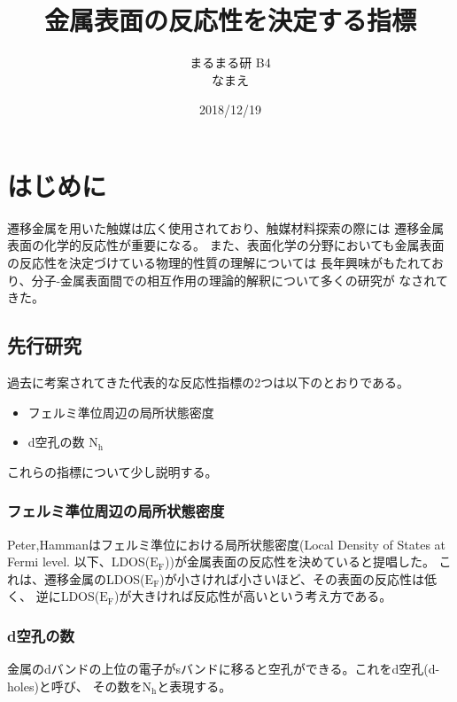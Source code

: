 \documentclass[12pt]{ltjsarticle}
\begin{document}
\begin{titlepage}
\title{金属表面の反応性を決定する指標}
\author{まるまる研 B4 \\ なまえ}
\date{2018/12/19}
\maketitle
\tableofcontents

\end{titlepage}

\section{はじめに}
遷移金属を用いた触媒は広く使用されており、触媒材料探索の際には
遷移金属表面の化学的反応性が重要になる。
また、表面化学の分野においても金属表面の反応性を決定づけている物理的性質の理解については
長年興味がもたれており、分子-金属表面間での相互作用の理論的解釈について多くの研究が
なされてきた。 \\

\subsection{先行研究}

過去に考案されてきた代表的な反応性指標の2つは以下のとおりである。

\begin{itemize}
 \item フェルミ準位周辺の局所状態密度
 \item d空孔の数 $\text{N}_\text{h}$
\end{itemize}

これらの指標について少し説明する。

\subsubsection{フェルミ準位周辺の局所状態密度}
Peter,Hammanはフェルミ準位における局所状態密度(Local Density of States at Fermi level.
以下、LDOS($\text{E}_\text{F}$))が金属表面の反応性を決めていると提唱した。
これは、遷移金属のLDOS($\text{E}_\text{F}$)が小さければ小さいほど、その表面の反応性は低く、
逆にLDOS($\text{E}_\text{F}$)が大きければ反応性が高いという考え方である。\cite{PeterJ.Feibelman1984}

\subsubsection{d空孔の数}
金属のdバンドの上位の電子がsバンドに移ると空孔ができる。これをd空孔(d-holes)と呼び、
その数を$\text{N}_\text{h}$と表現する。
\end{document}
